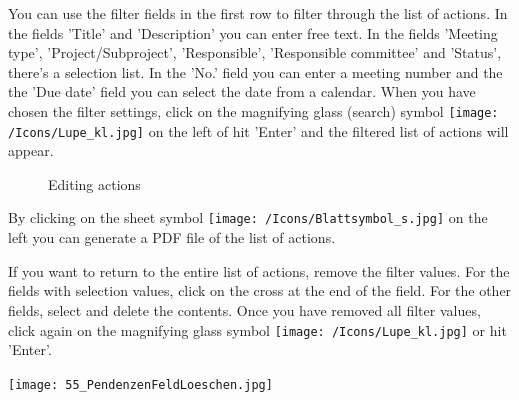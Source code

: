 \begin{figure}[H]
\end{figure}

You can use the filter fields in the first row to filter through the list of actions. In the fields 'Title' and 'Description' you can enter free text. In the fields 'Meeting type', 'Project/Subproject', 'Responsible', 'Responsible committee' and 'Status', there's a selection list. In the 'No.' field you can enter a meeting number and the the 'Due date' field you can select the date from a calendar. When you have chosen the filter settings, click on the magnifying glass (search) symbol \texttt{[image: /Icons/Lupe\_kl.jpg]}  on the left of hit 'Enter' and the filtered list of actions will appear.

\begin{figure}[H]
\caption{Editing actions}
\end{figure}

By clicking on the sheet symbol \texttt{[image: /Icons/Blattsymbol\_s.jpg]}  on the left you can generate a PDF file of the list of actions.

\vspace{\baselineskip}

If you want to return to the entire list of actions, remove the filter values. For the fields with selection values, click on the cross  at the end of the field. For the other fields, select and delete the contents. Once you have removed all filter values, click again on the magnifying glass symbol \texttt{[image: /Icons/Lupe\_kl.jpg]}  or hit 'Enter'.

\begin{center}
\texttt{[image: 55\_PendenzenFeldLoeschen.jpg]}
\end{center}


